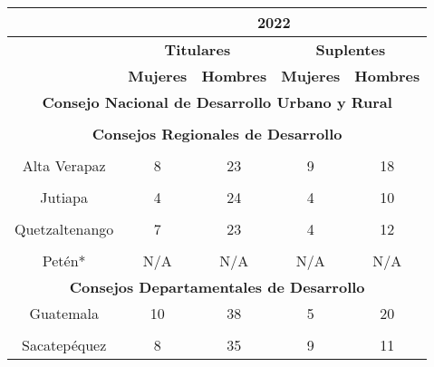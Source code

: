 \centering\begin{tabular}[t]{ccccc}
\toprule
\multicolumn{1}{c}{\textbf{ }} & \multicolumn{4}{c}{\textbf{2022}}\\	
\toprule
\multicolumn{1}{c}{\textbf{ }} & \multicolumn{2}{c}{\textbf{Titulares}} & \multicolumn{2}{c}{\textbf{Suplentes}} \\
\cmidrule(l{3pt}r{3pt}){2-3} \cmidrule(l{3pt}r{3pt}){4-5}
\textbf{} & \textbf{Mujeres} & \textbf{Hombres} & \textbf{Mujeres} & \textbf{Hombres}\\
\midrule
\multicolumn{5}{c}{\color{color3}\textbf{Consejo Nacional de Desarrollo Urbano y Rural}}\\
\midrule
\cellcolor[HTML]{B6B3FF}{ } & \cellcolor[HTML]{B6B3FF}{9} & \cellcolor[HTML]{B6B3FF}{39} & \cellcolor[HTML]{B6B3FF}{10} & \cellcolor[HTML]{B6B3FF}{32}\\
\midrule
\multicolumn{5}{c}{\color{color3}\textbf{Consejos Regionales de Desarrollo}}\\
\midrule
\cellcolor[HTML]{B6B3FF}{Guatemala*} & \cellcolor[HTML]{B6B3FF}{N/A} & \cellcolor[HTML]{B6B3FF}{N/A} & \cellcolor[HTML]{B6B3FF}{N/A} & \cellcolor[HTML]{B6B3FF}{N/A}\\
Alta Verapaz & 8 & 23 & 9 & 18\\
\cellcolor[HTML]{B6B3FF}{Zacapa} & \cellcolor[HTML]{B6B3FF}{11} & \cellcolor[HTML]{B6B3FF}{25} & \cellcolor[HTML]{B6B3FF}{6} & \cellcolor[HTML]{B6B3FF}{20}\\
Jutiapa & 4 & 24 & 4 & 10\\
\cellcolor[HTML]{B6B3FF}{Sacatepéquez} & \cellcolor[HTML]{B6B3FF}{11} & \cellcolor[HTML]{B6B3FF}{25} & \cellcolor[HTML]{B6B3FF}{4} & \cellcolor[HTML]{B6B3FF}{14}\\
Quetzaltenango & 7 & 23 & 4 & 12\\
\cellcolor[HTML]{B6B3FF}{Quiché} & \cellcolor[HTML]{B6B3FF}{5} & \cellcolor[HTML]{B6B3FF}{25} & \cellcolor[HTML]{B6B3FF}{3} & \cellcolor[HTML]{B6B3FF}{13}\\
Petén* & N/A & N/A & N/A & N/A\\
\midrule
\multicolumn{5}{c}{\color{color3}\textbf{Consejos Departamentales de Desarrollo}}\\
\midrule
Guatemala & 10 & 38 & 5 & 20\\
\cellcolor[HTML]{B6B3FF}{El Progreso} & \cellcolor[HTML]{B6B3FF}{4} & \cellcolor[HTML]{B6B3FF}{28} & \cellcolor[HTML]{B6B3FF}{5} & \cellcolor[HTML]{B6B3FF}{11}\\
Sacatepéquez & 8 & 35 & 9 & 11\\

\end{tabular}
